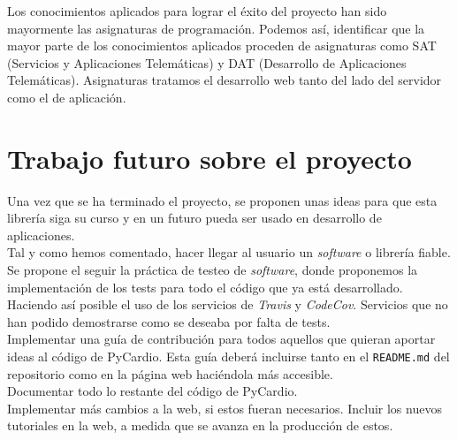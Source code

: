 Los conocimientos aplicados para lograr el éxito del proyecto han sido mayormente las asignaturas de programación. Podemos así, identificar que la mayor parte de los conocimientos aplicados proceden de asignaturas como SAT (Servicios y Aplicaciones Telemáticas) y DAT (Desarrollo de Aplicaciones Telemáticas). Asignaturas tratamos el desarrollo web tanto del lado del servidor como el de aplicación.

\section{Trabajo futuro sobre el proyecto}
\label{sec:trabajoFuturo}

Una vez que se ha terminado el proyecto, se proponen unas ideas para que esta librería siga su curso y en un futuro pueda ser usado en desarrollo de aplicaciones. \\
Tal y como hemos comentado, hacer llegar al usuario un \emph{software} o librería fiable. Se propone el seguir la práctica de testeo de \emph{software}, donde proponemos la implementación de los tests para todo el código que ya está desarrollado. Haciendo así posible el uso de los servicios de \emph{Travis} y \emph{CodeCov}. Servicios que no han podido demostrarse como se deseaba por falta de tests. \\
Implementar una guía de contribución para todos aquellos que quieran aportar ideas al código de PyCardio. Esta guía deberá incluirse tanto en el \texttt{README.md} del repositorio como en la página web haciéndola más accesible. \\
Documentar todo lo restante del código de PyCardio. \\
Implementar más cambios a la web, si estos fueran necesarios. Incluir los nuevos tutoriales en la web, a medida que se avanza en la producción de estos.
